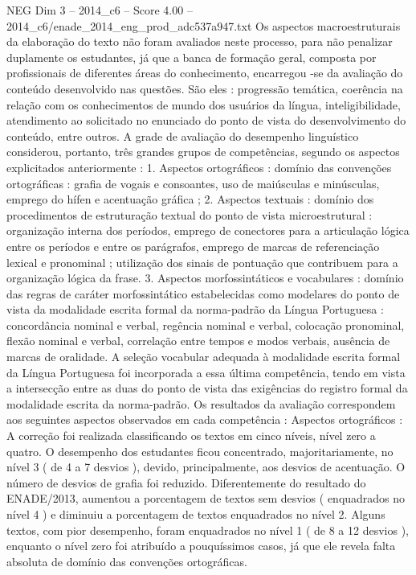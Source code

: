 \begin{textsample}{NEG Dim 3 – 2014\_c6 – Score 4.00 – 2014\_c6/enade\_2014\_eng\_prod\_adc537a947.txt}
Os aspectos macroestruturais da elaboração do texto não foram avaliados neste processo, para não penalizar duplamente os estudantes, já que a banca de formação geral, composta por profissionais de diferentes áreas do conhecimento, encarregou -se da avaliação do conteúdo desenvolvido nas questões.
São eles : progressão temática, coerência na relação com os conhecimentos de mundo dos usuários da língua, inteligibilidade, atendimento ao solicitado no enunciado do ponto de vista do desenvolvimento do conteúdo, entre outros.
A grade de avaliação do desempenho linguístico considerou, portanto, três grandes grupos de competências, segundo os aspectos explicitados anteriormente : 1.
Aspectos ortográficos : domínio das convenções ortográficas : grafia de vogais e consoantes, uso de maiúsculas e minúsculas, emprego do hífen e acentuação gráfica ; 2.
Aspectos textuais : domínio dos procedimentos de estruturação textual do ponto de vista microestrutural : organização interna dos períodos, emprego de conectores para a articulação lógica entre os períodos e entre os parágrafos, emprego de marcas de referenciação lexical e pronominal ; utilização dos sinais de pontuação que contribuem para a organização lógica da frase. 3.
Aspectos morfossintáticos e vocabulares : domínio das regras de caráter morfossintático estabelecidas como modelares do ponto de vista da modalidade escrita formal da norma-padrão da Língua Portuguesa : concordância nominal e verbal, regência nominal e verbal, colocação pronominal, flexão nominal e verbal, correlação entre tempos e modos verbais, ausência de marcas de oralidade.
A seleção vocabular adequada à modalidade escrita formal da Língua Portuguesa foi incorporada a essa última competência, tendo em vista a intersecção entre as duas do ponto de vista das exigências do registro formal da modalidade escrita da norma-padrão.
Os resultados da avaliação correspondem aos seguintes aspectos observados em cada competência : Aspectos ortográficos : A correção foi realizada classificando os textos em cinco níveis, nível zero a quatro.
O desempenho dos estudantes ficou concentrado, majoritariamente, no nível 3 ( de 4 a 7 desvios ), devido, principalmente, aos desvios de acentuação.
O número de desvios de grafia foi reduzido.
Diferentemente do resultado do ENADE/2013, aumentou a porcentagem de textos sem desvios ( enquadrados no nível 4 ) e diminuiu a porcentagem de textos enquadrados no nível 2.
Alguns textos, com pior desempenho, foram enquadrados no nível 1 ( de 8 a 12 desvios ), enquanto o nível zero foi atribuído a pouquíssimos casos, já que ele revela falta absoluta de domínio das convenções ortográficas.

\end{textsample}
